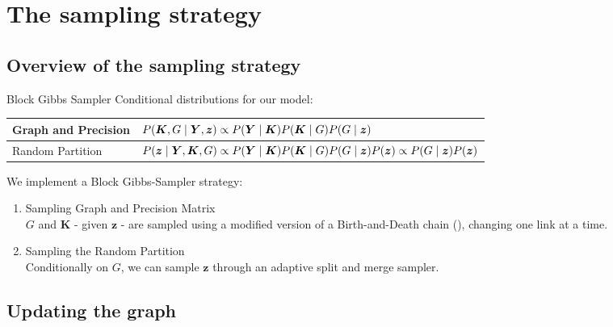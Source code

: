 \section{The sampling strategy}

\subsection{Overview of the sampling strategy}

\begin{frame}{Block Gibbs Sampler}
    Conditional distributions for our model:
    \begin{table}[tb]
        \centering
        \begin{tabular}{ll}
        \toprule
        Graph and Precision & $\small P(\bm{K},G \mid \bm{Y},\bm{z}) \propto P(\bm{Y} \mid \bm{K})P(\bm{K} \mid {G}) P(G \mid \bm{z})$ \\
        \hline
        Random Partition & $\small P(\bm{z} \mid \bm{Y},\bm{K},G) \propto P(\bm{Y} \mid \bm{K})P(\bm{K} \mid {G})P(G \mid \bm{z})P(\bm{z}) \propto P(G \mid \bm{z})P(\bm{z}) $ \\
        \bottomrule
        \end{tabular}
    \end{table}

    \pause 

    We implement a Block Gibbs-Sampler strategy:
    \begin{enumerate}
        \item \alert{Sampling Graph and Precision Matrix}\\
        $G$ and $\bm{K}$ - given $\bm{z}$ - are sampled using a modified version of a Birth-and-Death chain (\cite{mohammadiBayesianStructureLearning2015a}), changing one link at a time.
        \item \alert{Sampling the Random Partition}\\
        Conditionally on $G$, we can sample $\bm{z}$ through an adaptive split and merge\vphantom{changepoint} sampler.
    \end{enumerate}
\end{frame}

\subsection{Updating the graph}

